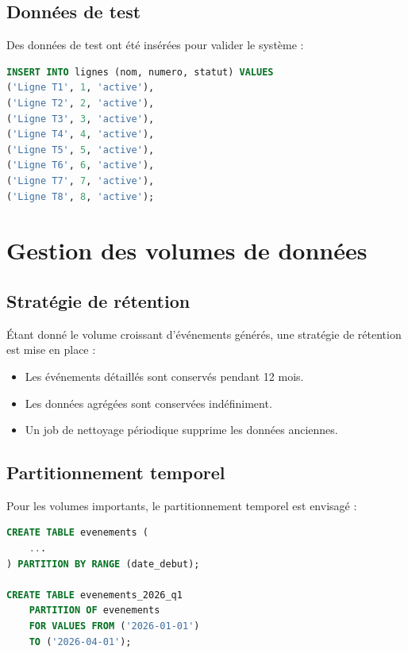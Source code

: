 \subsection{Donn\'ees de test}

Des donn\'ees de test ont \'et\'e ins\'er\'ees pour valider le syst\`eme :

\begin{lstlisting}[language=SQL,caption={Insertion des lignes de test},label={lst:insert}]
INSERT INTO lignes (nom, numero, statut) VALUES
('Ligne T1', 1, 'active'),
('Ligne T2', 2, 'active'),
('Ligne T3', 3, 'active'),
('Ligne T4', 4, 'active'),
('Ligne T5', 5, 'active'),
('Ligne T6', 6, 'active'),
('Ligne T7', 7, 'active'),
('Ligne T8', 8, 'active');
\end{lstlisting}

\section{Gestion des volumes de donn\'ees}

\subsection{Strat\'egie de r\'etention}

\'Etant donn\'e le volume croissant d'\'ev\'enements g\'en\'er\'es, une strat\'egie de r\'etention est mise en place :

\begin{itemize}
    \item Les \'ev\'enements d\'etaill\'es sont conserv\'es pendant 12 mois.
    \item Les donn\'ees agr\'eg\'ees sont conserv\'ees ind\'efiniment.
    \item Un job de nettoyage p\'eriodique supprime les donn\'ees anciennes.
\end{itemize}

\subsection{Partitionnement temporel}

Pour les volumes importants, le partitionnement temporel est envisag\'e :

\begin{lstlisting}[language=SQL,caption={Partitionnement temporel},label={lst:partition}]
CREATE TABLE evenements (
    ...
) PARTITION BY RANGE (date_debut);

CREATE TABLE evenements_2026_q1 
    PARTITION OF evenements
    FOR VALUES FROM ('2026-01-01') 
    TO ('2026-04-01');
\end{lstlisting}


